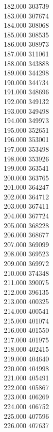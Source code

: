 { 182.000	303739 \\
 183.000	307674 \\
 184.000	308068 \\
 185.000	308535 \\
 186.000	308973 \\
 187.000	311061 \\
 188.000	343888 \\
 189.000	344298 \\
 190.000	344734 \\
 191.000	348696 \\
 192.000	349132 \\
 193.000	349498 \\
 194.000	349973 \\
 195.000	352651 \\
 196.000	353001 \\
 197.000	353498 \\
 198.000	353926 \\
 199.000	363541 \\
 200.000	363765 \\
 201.000	364247 \\
 202.000	364712 \\
 203.000	367411 \\
 204.000	367724 \\
 205.000	368228 \\
 206.000	368677 \\
 207.000	369099 \\
 208.000	369523 \\
 209.000	369972 \\
 210.000	374348 \\
 211.000	390075 \\
 212.000	396135 \\
 213.000	400325 \\
 214.000	400541 \\
 215.000	401074 \\
 216.000	401550 \\
 217.000	401975 \\
 218.000	402415 \\
 219.000	404640 \\
 220.000	404998 \\
 221.000	405491 \\
 222.000	405867 \\
 223.000	406269 \\
 224.000	406752 \\
 225.000	407596 \\
 226.000	407637 \\
}
